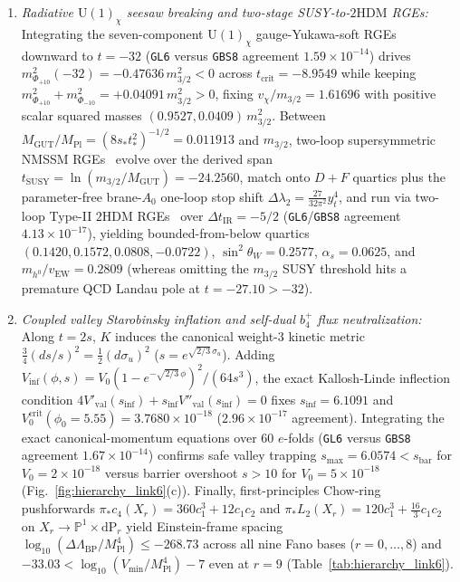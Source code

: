 \documentclass[aps,prd,twocolumn,nofootinbib,floatfix]{revtex4-2}
\begin{document}
\begin{enumerate}
    \item \emph{Radiative $\mathrm{U}(1)_\chi$ seesaw breaking and two-stage SUSY-to-$2\mathrm{HDM}$ RGEs:} Integrating the seven-component $\mathrm{U}(1)_\chi$ gauge-Yukawa-soft RGEs downward to $t = -32$ (\texttt{GL6} versus \texttt{GBS8} agreement $1.59\times 10^{-14}$) drives $m_{\Phi_{+10}}^2(-32) = -0.47636\,m_{3/2}^2 < 0$ across $t_{\mathrm{crit}} = -8.9549$ while keeping $m_{\Phi_{+10}}^2 + m_{\Phi_{-10}}^2 = +0.04091\,m_{3/2}^2 > 0$, fixing $v_\chi/m_{3/2} = 1.61696$ with positive scalar squared masses $(0.9527, 0.0409)\,m_{3/2}^2$. Between $M_{\mathrm{GUT}}/M_{\mathrm{Pl}} = (8s_* t_*^2)^{-1/2} = 0.011913$ and $m_{3/2}$, two-loop supersymmetric NMSSM RGEs~\cite{MartinVaughn1994,EllwangerHugonieTeixeira2010} evolve over the derived span $t_{\mathrm{SUSY}} = \ln(m_{3/2}/M_{\mathrm{GUT}}) = -24.2560$, match onto $D+F$ quartics plus the parameter-free brane-$A_0$ one-loop stop shift $\Delta\lambda_2 = \frac{27}{32\pi^2}y_t^4$, and run via two-loop Type-II $2\mathrm{HDM}$ RGEs~\cite{ChowdhuryEberhardt2015} over $\Delta t_{\mathrm{IR}} = -5/2$ (\texttt{GL6}/\texttt{GBS8} agreement $4.13\times 10^{-17}$), yielding bounded-from-below quartics $(0.1420, 0.1572, 0.0808, -0.0722)$, $\sin^2\theta_W = 0.2577$, $\alpha_s = 0.0625$, and $m_{h^0}/v_{\mathrm{EW}} = 0.2809$ (whereas omitting the $m_{3/2}$ SUSY threshold hits a premature QCD Landau pole at $t = -27.10 > -32$).
    \item \emph{Coupled valley Starobinsky inflation and self-dual $b_4^+$ flux neutralization:} Along $t = 2s$, $K$ induces the canonical weight-$3$ kinetic metric $\frac{3}{4}(ds/s)^2 = \frac{1}{2}(d\sigma_u)^2$ ($s = e^{\sqrt{2/3}\,\sigma_u}$). Adding $V_{\mathrm{inf}}(\phi,s) = V_0(1 - e^{-\sqrt{2/3}\,\phi})^2/(64 s^3)$, the exact Kallosh-Linde inflection condition $4V'_{\mathrm{val}}(s_{\mathrm{inf}}) + s_{\mathrm{inf}}V''_{\mathrm{val}}(s_{\mathrm{inf}}) = 0$ fixes $s_{\mathrm{inf}} = 6.1091$ and $V_0^{\mathrm{crit}}(\phi_0 = 5.55) = 3.7680\times 10^{-18}$ ($2.96\times 10^{-17}$ agreement). Integrating the exact canonical-momentum equations over $60$ $e$-folds (\texttt{GL6} versus \texttt{GBS8} agreement $1.67\times 10^{-14}$) confirms safe valley trapping $s_{\max} = 6.0574 < s_{\mathrm{bar}}$ for $V_0 = 2\times 10^{-18}$ versus barrier overshoot $s > 10$ for $V_0 = 5\times 10^{-18}$ (Fig.~\ref{fig:hierarchy_link6}(c)). Finally, first-principles Chow-ring pushforwards $\pi_* c_4(X_r) = 360 c_1^3 + 12 c_1 c_2$ and $\pi_* L_2(X_r) = 120 c_1^3 + \frac{16}{3}c_1 c_2$ on $X_r \to \mathbb{P}^1\times\mathrm{dP}_r$ yield Einstein-frame spacing $\log_{10}(\Delta\Lambda_{\mathrm{BP}}/M_{\mathrm{Pl}}^4) \le -268.73$ across all nine Fano bases ($r = 0,\dots,8$) and $-33.03 < \log_{10}(V_{\min}/M_{\mathrm{Pl}}^4) - 7$ even at $r = 9$ (Table~\ref{tab:hierarchy_link6}).
\end{enumerate}
\end{document}
